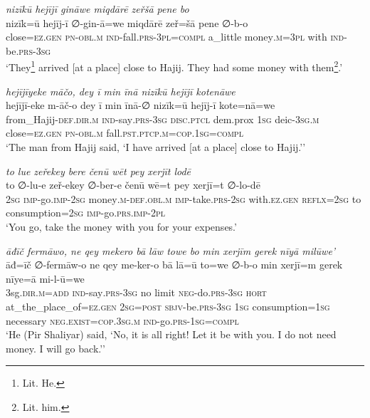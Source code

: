 \ea \label{ŽP.101}
\textit{nizīkū hejījī gināwe miqdārē zeřšā pene bo} \\ 
\gll nizīk=ū hejīj-ī ∅-gin-ā=we miqdārē zeř=šā pene ∅-b-o \\ 
 close\textsc{\textsc{=ez.gen}} \textsc{pn}\textsc{-obl}\textsc{.m} \textsc{ind-}fall\textsc{.prs}\textsc{-3pl}\textsc{=compl} a\_little money\textsc{.m}\textsc{=3pl} with \textsc{ind-}be\textsc{.prs}\textsc{-3sg} \\ 
\glt `They\footnote{Lit. He.} arrived [at a place] close to Hajij. They had some money with them\footnote{Lit. him.}.'
\z 
 
\ea \label{ŽP.102}
\textit{hejījīyeke māčo, dey ī min īnā nizīkū hejījī kotenāwe} \\ 
\gll hejījī-eke m-āč-o dey ī min īnā-∅ nizīk=ū hejīj-ī kote=nā=we \\ 
 from\_Hajij\textsc{-def}\textsc{.dir}\textsc{.m} \textsc{ind-}say\textsc{.prs}\textsc{-3sg} \textsc{disc.ptcl} dem.prox \textsc{1sg} deic\textsc{-3sg}\textsc{.m} close\textsc{\textsc{=ez.gen}} \textsc{pn}\textsc{-obl}\textsc{.m} fall\textsc{.pst}\textsc{.ptcp}\textsc{.m}\textsc{=cop}\textsc{.\textsc{1sg}}\textsc{=compl} \\ 
\glt `The man from Hajij said, ‘I have arrived [at a place] close to Hajij.’'
\z 
 
\ea \label{ŽP.103}
\textit{to lue zeřekey bere čenū wēt pey xerjīt lodē} \\ 
\gll to ∅-lu-e zeř-ekey ∅-ber-e čenū wē=t pey xerjī=t ∅-lo-dē \\ 
 \textsc{2sg} \textsc{imp-}go.\textsc{imp-}\textsc{2sg} money\textsc{.m}\textsc{-def}\textsc{.obl}\textsc{.m} \textsc{imp-}take\textsc{.prs}-\textsc{2sg} with\textsc{.ez.gen} \textsc{reflx}\textsc{=\textsc{2sg}} to consumption\textsc{=\textsc{2sg}} \textsc{imp-}go\textsc{.prs}.\textsc{imp-}\textsc{2pl} \\ 
\glt `You go, take the money with you for your expenses.'
\z 
 
\ea \label{ŽP.105}
\textit{āđīč fermāwo, ne qey mekero bā lāw towe bo min xerjīm gerek nīyā milūwe’} \\ 
\gll āđ=īč ∅-fermāw-o ne qey me-ker-o bā lā=ū to=we ∅-b-o min xerjī=m gerek nīye=ā mi-l-ū=we \\ 
 3sg\textsc{.dir}\textsc{.m}\textsc{=add} \textsc{ind-}say\textsc{.prs}\textsc{-3sg} no limit \textsc{neg-}do\textsc{.prs}\textsc{-3sg} \textsc{hort} at\_the\_place\_of\textsc{\textsc{=ez.gen}} \textsc{2sg}\textsc{=\textsc{post}} \textsc{sbjv-}be\textsc{.prs}\textsc{-3sg} \textsc{1sg} consumption\textsc{=\textsc{1sg}} necessary \textsc{\textsc{neg.}exist}\textsc{=cop}\textsc{.3sg}\textsc{.m} \textsc{ind-}go\textsc{.prs}\textsc{-\textsc{1sg}}\textsc{=compl} \\ 
\glt `He (Pir Shaliyar) said, ‘No, it is all right! Let it be with you. I do not need money. I will go back.’'
\z 
 
